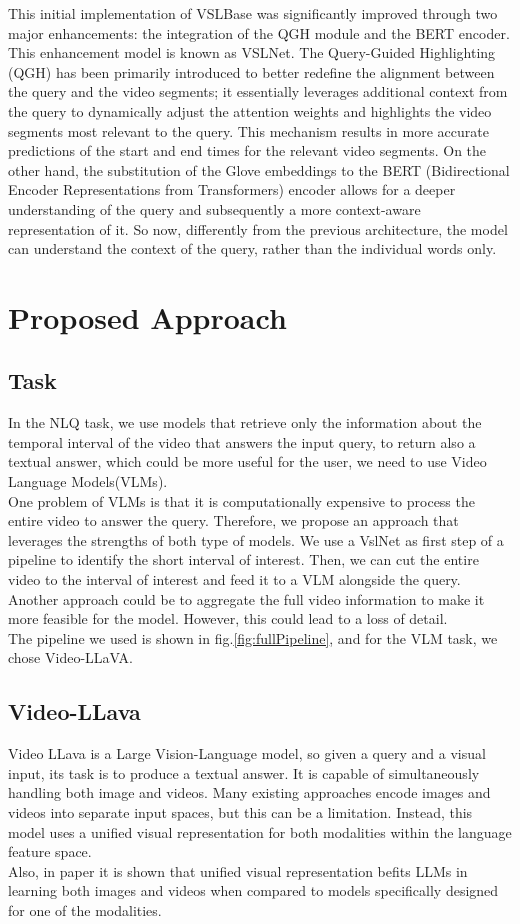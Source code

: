 \documentclass[conference]{IEEEtran}
\begin{document}
This initial implementation of VSLBase was significantly improved through two major enhancements: the integration of the QGH module and the BERT encoder. This enhancement model is known as VSLNet.
The Query-Guided Highlighting (QGH)  has been primarily introduced to better redefine the alignment between the query and the video segments; it essentially leverages additional context from the query to dynamically adjust the attention weights and highlights the video segments most relevant to the query. This mechanism results in more accurate predictions of the start and end times for the relevant video segments. On the other hand, the substitution of the Glove embeddings to the BERT (Bidirectional Encoder Representations from Transformers) encoder allows for a deeper understanding of the query and subsequently a more context-aware representation of it. So now, differently from the previous architecture, the model can understand the context of the query, rather than the individual words only.


\section{Proposed Approach}
\subsection{Task}
In the NLQ task, we use models that retrieve only the
information about the temporal interval of the video that
answers the input query, to return also a textual answer,
which could be more useful for the user, we need to use
Video Language Models(VLMs).\\
One problem of VLMs is that it is computationally expensive to process the entire video to answer the query. Therefore, we propose an approach that leverages the strengths of both type of models. We use a VslNet as first step of a pipeline to identify the short interval of interest. Then, we can cut the entire video to the interval of interest and feed it to a VLM alongside the query.
Another approach could be to aggregate the full video information to make it more feasible for the model. However, this could lead to a loss of detail.\\

The pipeline we used is shown in fig.\ref{fig:fullPipeline}, and for the VLM task, we chose Video-LLaVA.

\subsection{Video-LLava}
Video LLava is a Large Vision-Language model, so given a query and a visual input, its task is to produce a textual answer.  It is capable of simultaneously handling both image and videos. Many existing approaches encode images and videos into separate input spaces, but this can be a limitation. Instead, this model uses a unified visual representation for both modalities within the language feature space.\\
Also, in paper \cite{b2} it is shown that unified visual representation befits LLMs in learning both images and videos when compared to models specifically designed for one of the modalities.
\end{document}
